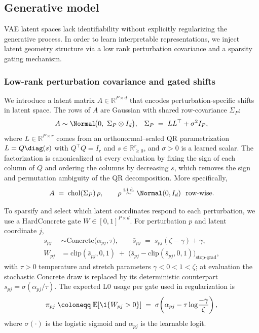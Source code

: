 \subsection{Generative model}
VAE latent spaces lack identifiability without explicitly regularizing the generative process. In
order to learn interpretable representations, we inject latent geometry structure via a low rank
perturbation covariance and a sparsity gating mechanism.

\subsubsection{Low-rank perturbation covariance and gated shifts}
We introduce a latent matrix $A \in \mathbb{R}^{P \times d}$ that encodes perturbation-specific
shifts in latent space. The rows of $A$ are Gaussian with shared row-covariance $\Sigma_P$:
\begin{align}
  A &\sim \Normal\!\big(0,\ \Sigma_P \otimes I_d\big),
  &
  \Sigma_P \;=\; L L^\top + \sigma^2 I_P,
  \label{eq:row-cov}
\end{align}
where $L \in \mathbb{R}^{P \times r}$ comes from an orthonormal--scaled QR parametrization
$L = Q \diag(s)$ with $Q^\top Q=I_r$ and $s \in \mathbb{R}^r_{\ge 0}$, and $\sigma>0$ is a learned
scalar. The factorization is canonicalized at every evaluation by fixing the sign of each column of
$Q$ and ordering the columns by decreasing $s$, which removes the sign and permutation ambiguity of
the QR decomposition. More specifically,
\[
A \;=\; \mathrm{chol}(\Sigma_P)\,\rho,\qquad
\rho \stackrel{\text{i.i.d.}}{\sim} \Normal(0, I_d)\ \ \text{row-wise}.
\]

To sparsify and select which latent coordinates respond to each perturbation, we use a HardConcrete
gate $W \in [0,1]^{P\times d}$. For perturbation $p$ and latent coordinate $j$,
\begin{align}
  s_{pj} &\sim \text{Concrete}\big(\alpha_{pj}, \tau\big),\qquad
  \bar{s}_{pj} \;=\; s_{pj}(\zeta-\gamma) + \gamma, \\
  W_{pj} &= \mathrm{clip}(\bar{s}_{pj}, 0, 1)\; +\; \big(\bar{s}_{pj} - \mathrm{clip}(\bar{s}_{pj}, 0,1)\big)_{\text{stop-grad}},
\end{align}
with $\tau>0$ temperature and stretch parameters $\gamma<0<1<\zeta$; at evaluation the stochastic
Concrete draw is replaced by its deterministic counterpart $s_{pj} = \sigma(\alpha_{pj}/\tau)$.
The expected L0 usage per gate used in regularization is
\begin{align}
  \pi_{pj}\;\coloneqq\; \mathbb{E}[\1\{W_{pj}>0\}]
  \;=\; \sigma\!\left(\alpha_{pj} - \tau \log\!\frac{-\gamma}{\zeta}\right),
  \label{eq:expected-l0}
\end{align}
where $\sigma(\cdot)$ is the logistic sigmoid and $\alpha_{pj}$ is the learnable logit.


